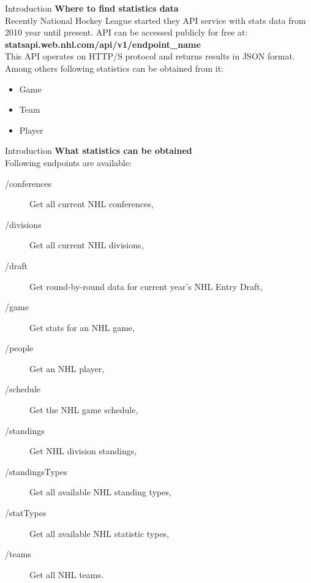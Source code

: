\begin{frame}{Introduction}
    \textbf{Where to find statistics data}\\
    \vspace{2em}
    Recently National Hockey League started they API service with stats data from 2010 year until present. API can be accessed publicly for free at: \textbf{statsapi.web.nhl.com/api/v1/endpoint\_name}\\
    \vspace{2em}
    This API operates on HTTP/S protocol and returns results in JSON format. Among others following statistics can be obtained from it:\\
    
    \begin{itemize}
        \item Game

        \item Team
        
        \item Player
    \end{itemize}
\end{frame} 

\begin{frame}{Introduction}
    \textbf{What statistics can be obtained}\\
    \vspace{2em}
    Following endpoints are available:
    
    \begin{description}
        \item[/conferences]     Get all current NHL conferences,
        \item[/divisions] 	    Get all current NHL divisions,
        \item[/draft] 	        Get round-by-round data for current year's NHL Entry Draft,
        \item[/game] 	        Get stats for an NHL game,
        \item[/people] 	        Get an NHL player,
        \item[/schedule] 	    Get the NHL game schedule,
        \item[/standings] 	    Get NHL division standings,
        \item[/standingsTypes] 	Get all available NHL standing types,
        \item[/statTypes]       Get all available NHL statistic types,
        \item[/teams] 	        Get all NHL teams.
    \end{description}
\end{frame}

